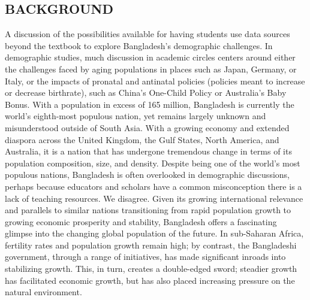 \documentclass[a4paper,12pt]{article}
\begin{document}
\subsection{BACKGROUND}
A discussion of the possibilities available for having students use data sources beyond the textbook to explore Bangladesh’s demographic challenges.
In demographic studies, much discussion in academic circles centers around either the challenges faced by aging populations in places such as Japan, Germany, or Italy, or the impacts of pronatal and antinatal policies (policies meant to increase or decrease birthrate), such as China’s One-Child Policy or Australia’s Baby Bonus. With a population in excess of 165 million, Bangladesh is currently the world’s eighth-most populous nation, yet remains largely unknown and misunderstood outside of South Asia. With a growing economy and extended diaspora across the United Kingdom, the Gulf States, North America, and Australia, it is a nation that has undergone tremendous change in terms of its population composition, size, and density. Despite being one of the world’s most populous nations, Bangladesh is often overlooked in demographic discussions, perhaps because educators and scholars have a common misconception there is a lack of teaching resources. We disagree. Given its growing international relevance and parallels to similar nations transitioning from rapid population growth to growing economic prosperity and stability, Bangladesh offers a fascinating glimpse into the changing global population of the future. In sub-Saharan Africa, fertility rates and population growth remain high; by contrast, the Bangladeshi government, through a range of initiatives, has made significant inroads into stabilizing growth. This, in turn, creates a double-edged sword; steadier growth has facilitated economic growth, but has also placed increasing pressure on the natural environment.
\newline
\end{document}
